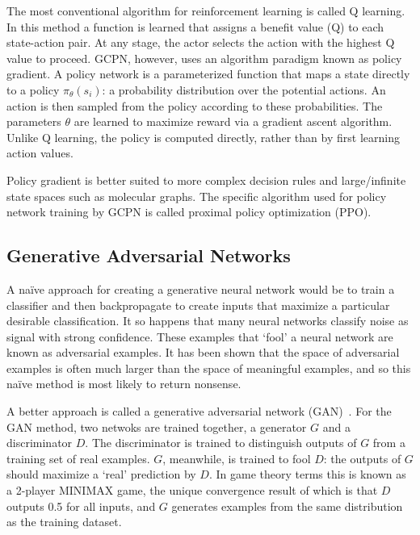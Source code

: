 \documentclass{article}
\begin{document}
The most conventional algorithm for reinforcement learning is called Q learning. In this method a function is learned that assigns a benefit value (Q) to each state-action pair. At any stage, the actor selects the action with the highest Q value to proceed. GCPN, however, uses an algorithm paradigm known as policy gradient. A policy network is a parameterized function that maps a state directly to a policy $\pi_\theta(s_i)$: a probability distribution over the potential actions. An action is then sampled from the policy according to these probabilities. The parameters $\theta$ are learned to maximize reward via a gradient ascent algorithm. Unlike Q learning, the policy is computed directly, rather than by first learning action values.

Policy gradient is better suited to more complex decision rules and large/infinite state spaces such as molecular graphs. The specific algorithm used for policy network training by GCPN is called proximal policy optimization (PPO).

\subsection{Generative Adversarial Networks}
A na\"ive approach for creating a generative neural network would be to train a classifier and then backpropagate to create inputs that maximize a particular desirable classification. It so happens that many neural networks classify noise as signal with strong confidence. These examples that `fool' a neural network are known as adversarial examples. It has been shown that the space of adversarial examples is often much larger than the space of meaningful examples, and so this na\"ive method is most likely to return nonsense.

A better approach is called a generative adversarial network (GAN)~\cite{GAN}. For the GAN method, two netwoks are trained together, a generator $G$ and a discriminator $D$. The discriminator is trained to distinguish outputs of $G$ from a training set of real examples. $G$, meanwhile, is trained to fool $D$: the outputs of $G$ should maximize a `real' prediction by $D$. In game theory terms this is known as a 2-player MINIMAX game, the unique convergence result of which is that $D$ outputs 0.5 for all inputs, and $G$ generates examples from the same distribution as the training dataset.
\end{document}
